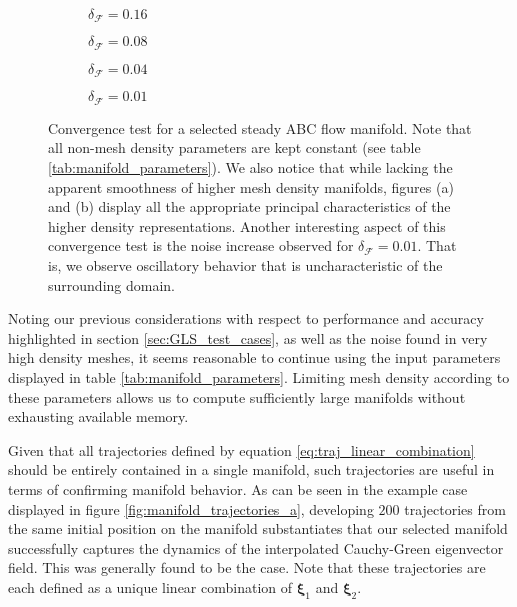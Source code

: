 \begin{figure}[h!]

\centering
\begin{subfigure}[b]{0.45\textwidth}
\centering

\caption{$\delta_{\mathcal{F}}=0.16$}\label{fig:convergence_test_a}
\end{subfigure}
\begin{subfigure}[b]{0.45\textwidth}
\centering

\caption{$\delta_{\mathcal{F}}=0.08$}\label{fig:convergence_test_b}
\end{subfigure}
\begin{subfigure}[b]{0.45\textwidth}
\centering

\caption{$\delta_{\mathcal{F}}=0.04$}\label{fig:convergence_test_c}
\end{subfigure}
\begin{subfigure}[b]{0.45\textwidth}
\centering

\caption{$\delta_{\mathcal{F}}=0.01$}\label{fig:convergence_test_d}
\end{subfigure}

\caption{Convergence test for a selected steady ABC flow manifold. Note that all non-mesh density parameters are kept constant (see table \ref{tab:manifold_parameters}). We also notice that while lacking the apparent smoothness of higher mesh density manifolds, figures (a) and (b) display all the appropriate principal characteristics of the higher density representations. Another interesting aspect of this convergence test is the noise increase observed for $\delta_{\mathcal{F}}=0.01$. That is, we observe oscillatory behavior that is uncharacteristic of the surrounding domain.}\label{fig:convergence_test}
\end{figure}

Noting our previous considerations with respect to performance and accuracy highlighted in section \ref{sec:GLS_test_cases}, as well as the noise found in very high density meshes, it seems reasonable to continue using the input parameters displayed in table \ref{tab:manifold_parameters}. Limiting mesh density according to these parameters allows us to compute sufficiently large manifolds without exhausting available memory.

Given that all trajectories defined by equation \eqref{eq:traj_linear_combination} should be entirely contained in a single manifold, such trajectories are useful in terms of confirming manifold behavior. As can be seen in the example case displayed in figure \ref{fig:manifold_trajectories_a}, developing $200$ trajectories from the same initial position on the manifold substantiates that our selected manifold successfully captures the dynamics of the interpolated Cauchy-Green eigenvector field. This was generally found to be the case. Note that these trajectories are each defined as a unique linear combination of $\bm{\xi}_1$ and $\bm{\xi}_2$.

